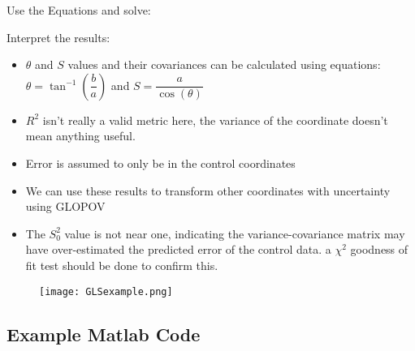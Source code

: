 Use the Equations and solve:

Interpret the results:
\begin{itemize}
	\item $\theta$ and $S$ values and their covariances can be calculated using equations: $\theta = \tan^{-1}(\dfrac{b}{a})$ and $S = \dfrac{a}{\cos(\theta)}$
	\item $R^2$ isn't really a valid metric here, the variance of the coordinate doesn't mean anything useful.
	\item Error is assumed to only be in the control coordinates
	\item We can use these results to transform other coordinates with uncertainty using GLOPOV
	\item The $S_0^2$ value is not near one, indicating the variance-covariance matrix may have over-estimated the predicted error of the control data. a $\chi^2$ goodness of fit test should be done to confirm this.  
\end{itemize}
\begin{figure}[H]
	\centering
	\texttt{[image: GLSexample.png]}
\end{figure}
\clearpage
\subsection{Example Matlab Code}






